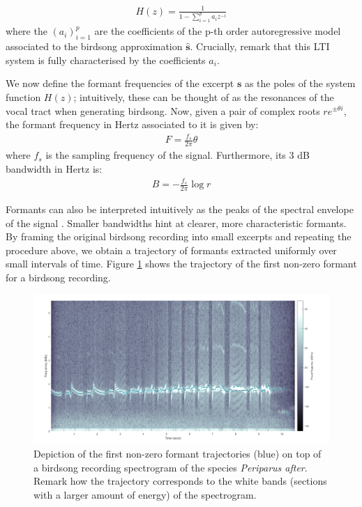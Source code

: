 \documentclass[pdftex,11pt,a4paper]{article}
\theoremstyle{definition}
\theoremstyle{remark}
\newcommand*{\V}[1]{\mathbf{#1}}%
\begin{document}
\begin{align*}
H(z) = \frac{1}{1-\sum_{i=1}^pa_iz^{-i}}
\end{align*}
where the $(a_i)_{i=1}^p$ are the coefficients of the p-th order autoregressive model associated to the birdsong approximation $\hat{\V{s}}$. Crucially, remark that this LTI system is fully characterised by the coefficients $a_i$. 
\par We now define the formant frequencies of the excerpt $\V{s}$ as the poles of the system function $H(z)$; intuitively, these can be thought of as the resonances of the vocal tract \cite{Prica2010} when generating birdsong. Now, given a pair of complex roots $re^{\pm\theta i}$, the formant frequency in Hertz associated to it is given by:
\begin{align*}
F = \frac{f_s}{2\pi}\theta
\end{align*}
where $f_s$ is the sampling frequency of the signal. Furthermore, its 3 dB bandwidth in Hertz is:
\begin{align*}
B = -\frac{f_s}{2\pi}\log{r}
\end{align*}
\par Formants can also be interpreted intuitively as the peaks of the spectral envelope of the signal \cite{Darch}. Smaller bandwidths hint at clearer, more characteristic formants. By framing the original birdsong recording into small excerpts and repeating the procedure above, we obtain a trajectory of formants extracted uniformly over small intervals of time. Figure \ref{fig_specformants} shows the trajectory of the first non-zero formant for a birdsong recording.

\begin{figure}[t]
\centering
\includegraphics[width=\textwidth]{images/formants}
\caption{Depiction of the first non-zero formant trajectories (blue) on top of a birdsong recording spectrogram of the species \emph{Periparus after}. Remark how the trajectory corresponds to the white bands (sections with a larger amount of energy) of the spectrogram.}
\label{fig_specformants}
\end{figure}
\end{document}
